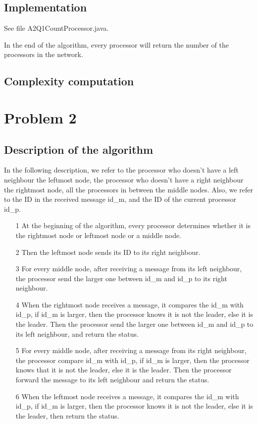 \documentclass[paper=a4, fontsize=11pt]{scrartcl} %
\numberwithin{equation}{section} %
\numberwithin{figure}{section} %
\numberwithin{table}{section} %
\begin{document}
\subsection*{Implementation}
See file A2Q1CountProcessor.java.

In the end of the algorithm, every processor will return the number of the processors in the network.
\subsection*{Complexity computation}

\section*{Problem 2}
\subsection*{Description of the algorithm}
In the following description, we refer to the processor who doesn't have a left neighbour the leftmost node, the processor who doesn't have a right neighbour the rightmost node, all the processors in between the middle nodes. Also, we refer to the ID in the received message id\_m, and the ID of the current processor id\_p.
\begin{itemize}
	\item[1] At the beginning of the algorithm, every processor determines whether it is the rightmost node or leftmost node or a middle node.

	\item[2] Then the leftmost node sends its ID to its right neighbour.

	\item[3] For every middle node, after receiving a message from its left neighbour, the processor send the larger one between id\_m and id\_p to its right neighbour.
	\item[4] When the rightmost node receives a message, it compares the id\_m with id\_p, if id\_m is larger, then the processor knows it is not the leader, else it is the leader. Then the processor send the larger one between id\_m and id\_p to its left neighbour, and return the status.
	\item[5] For every middle node, after receiving a message from its right neighbour, the processor compare id\_m with id\_p, if id\_m is larger, then the processor knows that it is not the leader, else it is the leader. Then the processor forward the message to its left neighbour and return the status.
	\item[6] When the leftmost node receives a message, it compares the id\_m with id\_p, if id\_m is larger, then the processor knows it is not the leader, else it is the leader, then return the status.
\end{itemize}
\end{document}
